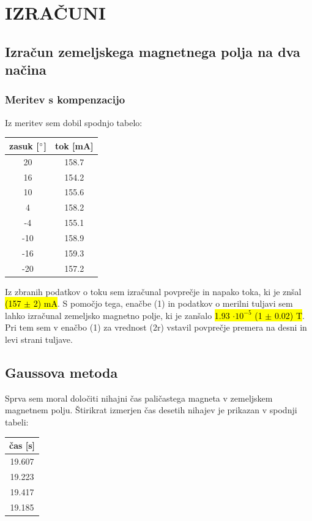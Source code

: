 \documentclass[12pt,a4paper]{article}
\begin{document}
\section{IZRA\v CUNI}

\subsection{Izra\v cun zemeljskega magnetnega polja na dva na\v cina}

\subsubsection{Meritev s kompenzacijo}

Iz meritev sem dobil spodnjo tabelo:

\begin{center}
	\begin{tabular}{ |c|c| } 
		\hline
		zasuk [$\degree$] & tok [mA]\\
		\hline
		20 & 158.7 \\
		16 & 154.2 \\
		10 & 155.6 \\
		4  & 158.2 \\
		-4 & 155.1 \\
		-10& 158.9 \\
		-16& 159.3 \\
		-20& 157.2 \\  
		\hline
	\end{tabular}
\end{center}

Iz zbranih podatkov o toku sem izra\v cunal povpre\v cje in napako toka, ki je zn\v sal \hl{(157 $\pm$ 2) mA}. S pomo\v cjo tega, ena\v cbe (1) in podatkov o merilni tuljavi sem lahko izra\v cunal zemeljsko magnetno polje, ki je zan\v salo \hl{1.93 $\cdot 10^{-5}$ (1 $\pm$ 0.02) T}. Pri tem sem v ena\v cbo (1) za vrednost (2r) vstavil povpre\v cje premera na desni in levi strani tuljave.

\subsection{Gaussova metoda}

Sprva sem moral dolo\v citi nihajni \v cas pali\v castega magneta v zemeljskem magnetnem polju. \v Stirikrat izmerjen \v cas desetih nihajev je prikazan v spodnji tabeli:

\begin{center}
	\begin{tabular}{ |c| } 
		\hline
		\v cas [s]\\
		\hline
		19.607\\
		19.223\\
		19.417\\
		19.185\\  
		\hline
	\end{tabular}
\end{center}
\end{document}
